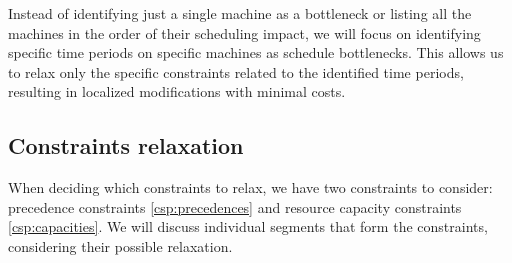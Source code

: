 Instead of identifying just a single machine as a bottleneck
or listing all the machines in the order of their scheduling impact,
we will focus on identifying specific time periods on specific machines as schedule bottlenecks.
This allows us to relax only the specific constraints related to the identified time periods,
resulting in localized modifications with minimal costs.

\subsection{Constraints relaxation} \label{subsec:problem-statement/bottlenecks/constraints-relaxation}

When deciding which constraints to relax,
we have two constraints to consider: precedence constraints \eqref{csp:precedences}
and resource capacity constraints \eqref{csp:capacities}.
We will discuss individual segments that form the constraints,
considering their possible relaxation.

